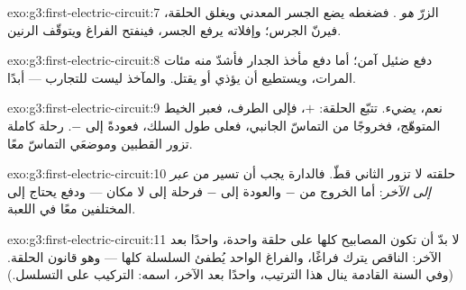 \begin{solution}{exo:g3:first-electric-circuit:7}
الزرّ \emph{هو} . فضغطه يضع الجسر المعدني ويغلق الحلقة،
فيرنّ الجرس؛ وإفلاته يرفع الجسر، فينفتح الفراغ ويتوقّف الرنين.
\end{solution}

\begin{solution}{exo:g3:first-electric-circuit:8}
دفع  ضئيل آمن؛ أما دفع مأخذ الجدار فأشدّ منه مئات
المرات، ويستطيع أن يؤذي أو يقتل. والمآخذ ليست للتجارب ---
أبدًا.
\end{solution}

\begin{solution}{exo:g3:first-electric-circuit:9}
نعم، يضيء. تتبّع الحلقة:  $+$، فإلى الطرف، فعبر الخيط
المتوهّج، فخروجًا من التماسّ الجانبي، فعلى طول السلك، فعودةً
إلى $-$. رحلة كاملة تزور القطبين وموضعَي التماسّ معًا.
\end{solution}

\begin{solution}{exo:g3:first-electric-circuit:10}
حلقته لا تزور  الثاني قطّ. فالدارة يجب أن تسير من 
\emph{عبر  إلى  الآخر}: أما الخروج من $-$ والعودة
إلى $-$ فرحلة إلى لا مكان --- ودفع  يحتاج إلى 
المختلفين معًا في اللعبة.
\end{solution}

\begin{solution}{exo:g3:first-electric-circuit:11}
لا بدّ أن تكون المصابيح كلها على حلقة واحدة، واحدًا بعد الآخر:
 الناقص يترك فراغًا، والفراغ الواحد يُطفئ السلسلة كلها
--- وهو قانون الحلقة. (وفي السنة القادمة ينال هذا الترتيب،
واحدًا بعد الآخر، اسمه: التركيب على التسلسل.)
\end{solution}
